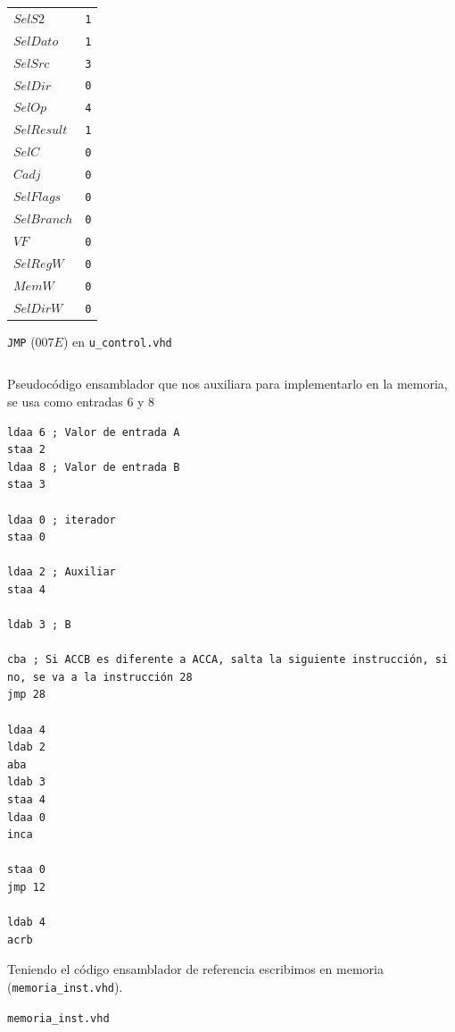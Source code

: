 \documentclass{IEEEtran}
\newenvironment{code}{\captionsetup{type=listing}}{}
\begin{document}
\begin{itemize}
\begin{table}[htbp]
\begin{tabular}{ll}
\(SelS2\) & \texttt{1}\\
\(SelDato\) & \texttt{1}\\
\(SelSrc\) & \texttt{3}\\
\(SelDir\) & \texttt{0}\\
\(SelOp\) & \texttt{4}\\
\(SelResult\) & \texttt{1}\\
\(SelC\) & \texttt{0}\\
\(Cadj\) & \texttt{0}\\
\(SelFlags\) & \texttt{0}\\
\(SelBranch\) & \texttt{0}\\
\(VF\) & \texttt{0}\\
\(SelRegW\) & \texttt{0}\\
\(MemW\) & \texttt{0}\\
\(SelDirW\) & \texttt{0}\\
\hline
\end{tabular}
\end{table}
\begin{code}
\caption{\texttt{JMP} ($007E$) en \texttt{u\_control.vhd}}
\inputminted[firstline=253, lastline=271]{vhdl}{../Risc/u_control.vhd}
\end{code}
\end{itemize}

\begin{code}
\caption{Pseudocódigo ensamblador que nos auxiliara para implementarlo en la memoria, se usa como entradas 6 y 8}
\begin{verbatim}
ldaa 6 ; Valor de entrada A
staa 2
ldaa 8 ; Valor de entrada B
staa 3

ldaa 0 ; iterador
staa 0

ldaa 2 ; Auxiliar
staa 4

ldab 3 ; B

cba ; Si ACCB es diferente a ACCA, salta la siguiente instrucción, si no, se va a la instrucción 28
jmp 28

ldaa 4
ldab 2
aba
ldab 3
staa 4
ldaa 0
inca

staa 0
jmp 12

ldab 4
acrb
\end{verbatim}
\end{code}

Teniendo el código ensamblador de referencia escribimos en memoria (\texttt{memoria\_inst.vhd}).
\begin{code}
\caption{\texttt{memoria\_inst.vhd}}
\inputminted{vhdl}{../Risc/memoria_inst.vhd}
\end{code}
\end{document}
